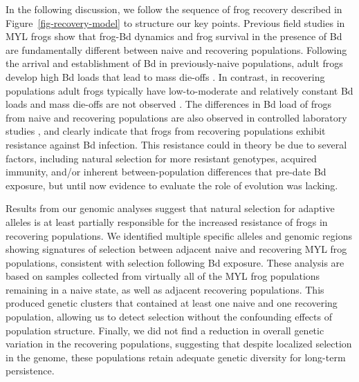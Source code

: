 \documentclass[9pt,twocolumn,twoside,lineno]{pnas-new}
\begin{document}
In the following discussion, we follow the sequence of frog recovery
described in Figure~\ref{fig-recovery-model} to structure our key
points. Previous field studies in MYL frogs show that frog-Bd dynamics
and frog survival in the presence of Bd are fundamentally different
between naive and recovering populations. Following the arrival and
establishment of Bd in previously-naive populations, adult frogs develop
high Bd loads that lead to mass die-offs \citep{vredenburg2010}. In
contrast, in recovering populations adult frogs typically have
low-to-moderate and relatively constant Bd loads and mass die-offs are
not observed \citep[see also Figure S2]{briggs2010, knapp2011}. The differences in Bd load of frogs from
naive and recovering populations are also observed in controlled
laboratory studies \citep[see Figure 4 in][]{knapp2016}, and clearly
indicate that frogs from recovering populations exhibit resistance
against Bd infection. This resistance could in theory be due to several
factors, including natural selection for more resistant genotypes,
acquired immunity, and/or inherent between-population differences that
pre-date Bd exposure, but until now evidence to evaluate the role of
evolution was lacking.

Results from our genomic analyses suggest that natural selection for
adaptive alleles is at least partially responsible for the increased
resistance of frogs in recovering populations. We identified multiple
specific alleles and genomic regions showing signatures of selection
between adjacent naive and recovering MYL frog populations, consistent
with selection following Bd exposure. These analysis are based on
samples collected from virtually all of the MYL frog populations
remaining in a naive state, as well as adjacent recovering populations.
This produced genetic clusters that contained at least one naive and one
recovering population, allowing us to detect selection without the
confounding effects of population structure. Finally, we did not find a
reduction in overall genetic variation in the recovering populations,
suggesting that despite localized selection in the genome, these
populations retain adequate genetic diversity for long-term persistence.
\end{document}
